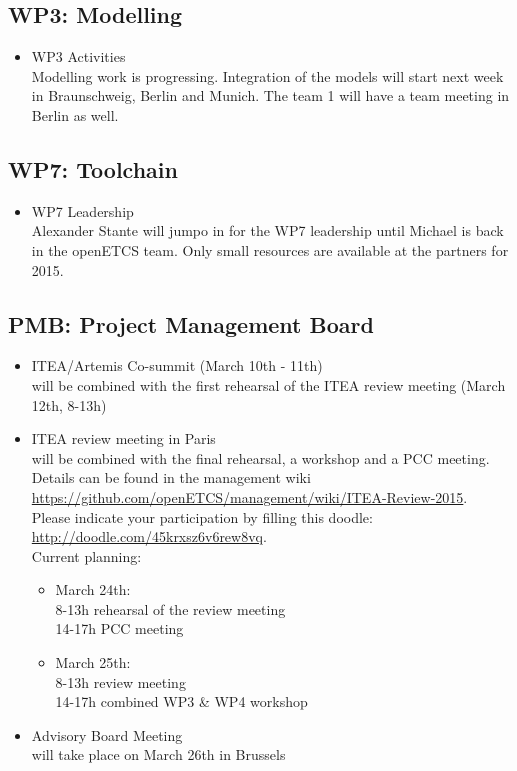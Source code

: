 \documentclass[a4paper, 11pt]{article}
\begin{document}
\subsection{WP3: Modelling}


\begin{itemize}
\item WP3 Activities\\
Modelling work is progressing.
Integration of the models will start next week in Braunschweig, Berlin and Munich. The team 1 will have a team meeting in Berlin as well.

\end{itemize}

\subsection{WP7: Toolchain}

\begin{itemize}
\item WP7 Leadership\\
Alexander Stante will jumpo in for the WP7 leadership until Michael is back in the openETCS team. Only small resources are available at the partners for 2015.

\end{itemize}

\subsection{PMB: Project Management Board}
\begin{itemize}
\item ITEA/Artemis Co-summit (March 10th - 11th)\\
will be combined with the first rehearsal of the ITEA review meeting (March 12th, 8-13h)

\item ITEA review meeting in Paris\\
will be combined with the final rehearsal, a workshop and a PCC meeting. Details can be found in the management wiki \url{https://github.com/openETCS/management/wiki/ITEA-Review-2015}.\\
Please indicate your participation by filling this doodle: \url{http://doodle.com/45krxsz6v6rew8vq}.\\
Current planning:\\

\begin{itemize}
\item March 24th:\\
8-13h rehearsal of the review meeting\\
14-17h PCC meeting\\
\item March 25th:\\
8-13h review meeting\\
14-17h combined WP3 \& WP4 workshop \\
\end{itemize}
\item Advisory Board Meeting\\
will take place on March 26th in Brussels

\end{itemize}
\end{document}
